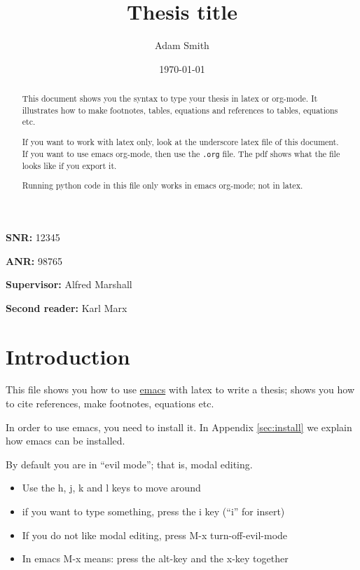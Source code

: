 \documentclass[11pt]{article}
\author{Adam Smith}
\date{\today}
\title{Thesis title}
\begin{document}
\maketitle
\begin{abstract}
This document shows you the syntax to type your thesis in latex or org-mode. It illustrates how to make footnotes, tables, equations and references to tables, equations etc.

If you want to work with latex only, look at the underscore latex file of this document. If you want to use emacs org-mode, then use the \texttt{.org} file. The pdf shows what the file looks like if you export it.

Running python code in this file only works in emacs org-mode; not in latex.
\end{abstract}


\vspace{10mm}

\textbf{SNR:} 12345

\textbf{ANR:} 98765

\vspace{10mm}
\textbf{Supervisor:} Alfred Marshall

\textbf{Second reader:} Karl Marx



\newpage



\setcounter{tocdepth}{2}
\tableofcontents

\newpage

\section{Introduction}
\label{sec:intro}

This file shows you how to use \href{https://www.gnu.org/software/emacs/}{emacs} with latex to write a thesis; shows you how to cite references, make footnotes, equations etc.

In order to use emacs, you need to install it. In Appendix \ref{sec:install} we explain how emacs can be installed.

By default you are in ``evil mode''; that is, modal editing.

\begin{itemize}
\item Use the h, j, k and l keys to move around
\item if you want to type something, press the i key (``i'' for insert)
\item If you do not like modal editing, press M-x turn-off-evil-mode
\item In emacs M-x means: press the alt-key and the x-key together
\end{itemize}
\end{document}
